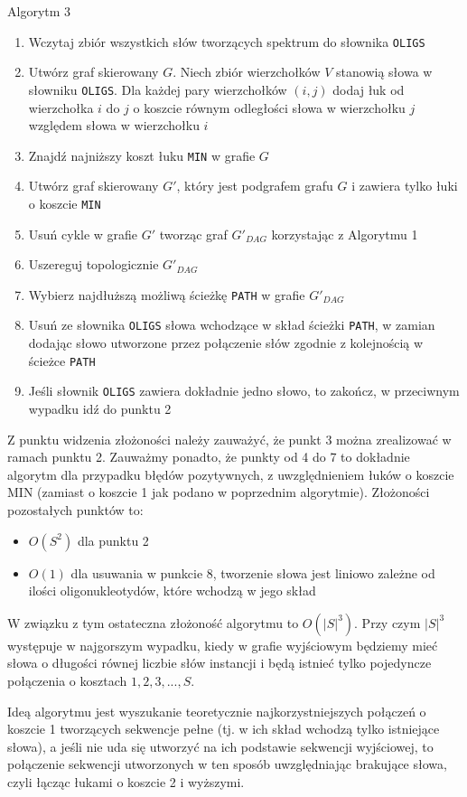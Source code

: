 \documentclass[a4paper,10pt]{article}
\begin{document}
Algorytm 3
\begin{enumerate}
 \item Wczytaj zbiór wszystkich słów tworzących spektrum do słownika \texttt{OLIGS}
 \item Utwórz graf skierowany $G$. Niech zbiór wierzchołków $V$ stanowią słowa w słowniku \texttt{OLIGS}. Dla każdej pary wierzchołków $(i,j)$ dodaj 
       łuk od wierzchołka $i$ do $j$ o koszcie równym odległości słowa w wierzchołku $j$ względem słowa w wierzchołku $i$
 \item Znajdź najniższy koszt łuku \texttt{MIN} w grafie $G$
 \item Utwórz graf skierowany $G'$, który jest podgrafem grafu $G$ i zawiera tylko łuki o koszcie \texttt{MIN}
 \item Usuń cykle w grafie $G'$ tworząc graf $G'_{DAG}$ korzystając z Algorytmu 1
 \item Uszereguj topologicznie $G'_{DAG}$
 \item Wybierz najdłuższą możliwą ścieżkę \texttt{PATH} w grafie $G'_{DAG}$
 \item Usuń ze słownika \texttt{OLIGS} słowa wchodzące w skład ścieżki \texttt{PATH}, w zamian dodając słowo utworzone przez połączenie słów zgodnie z kolejnością w ścieżce \texttt{PATH}
 \item Jeśli słownik \texttt{OLIGS} zawiera dokładnie jedno słowo, to zakończ, w przeciwnym wypadku idź do punktu 2
\end{enumerate}

Z punktu widzenia złożoności należy zauważyć, że punkt 3 można zrealizować w ramach punktu 2. Zauważmy ponadto, że punkty od 4 do 7 to dokładnie algorytm dla przypadku błędów pozytywnych, 
z uwzględnieniem łuków o koszcie MIN (zamiast o koszcie 1 jak podano w poprzednim algorytmie). Złożoności pozostałych punktów to:
\begin{itemize}
 \item $O(S^2)$ dla punktu 2
 \item $O(1)$ dla usuwania w punkcie 8, tworzenie słowa jest liniowo zależne od ilości oligonukleotydów, które wchodzą w jego skład
\end{itemize}
W związku z tym ostateczna złożoność algorytmu to $O(|S|^3)$. Przy czym $|S|^3$ występuje w najgorszym wypadku, 
kiedy w grafie wyjściowym będziemy mieć słowa o długości równej liczbie słów instancji i będą istnieć tylko pojedyncze połączenia o kosztach $1, 2, 3, ..., S$.

Ideą algorytmu jest wyszukanie teoretycznie najkorzystniejszych połączeń o koszcie 1 tworzących sekwencje 
pełne (tj. w ich skład wchodzą tylko istniejące słowa), a jeśli nie uda się utworzyć na ich podstawie sekwencji wyjściowej, 
to połączenie sekwencji utworzonych w ten sposób uwzględniając brakujące słowa, czyli łącząc łukami o koszcie 2 i wyższymi. 
\end{document}
